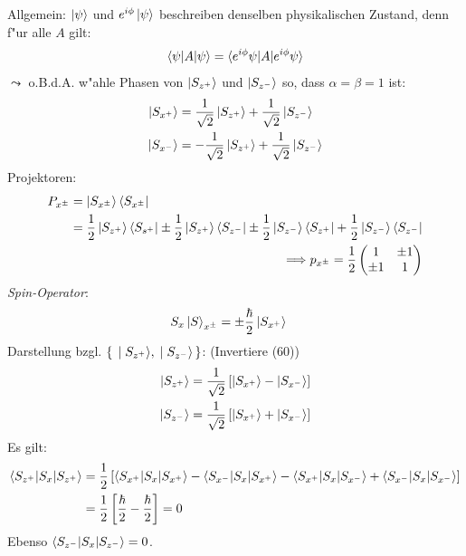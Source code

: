 \documentclass[a4paper]{scrartcl}
\begin{document}
{\begin{aaufz}
Allgemein: $\ket \psi$ und $e ^{i \phi} \ket \psi$ beschreiben denselben physikalischen Zustand, denn f"ur alle $A$ gilt:
$$\braket{ \psi | A  | \psi} = \braket{ e^{i \phi} \psi | A | e^{i \phi} \psi }$$
$\leadsto$ o.B.d.A. w"ahle Phasen von $\ket {S_{z^+}}$ und $\ket{ S_{z^-}}$ so, dass $\alpha = \beta = 1$ ist:
\begin{align}
\begin{split}
\ket{ S_{x^+}} & = \frac1{\sqrt2} \ket{S_{z^+}} + \frac1{\sqrt2} \ket{S_{z^-}} \\
\ket{ S_{x^-}} & = -\frac1{\sqrt2} \ket{ S_{z^+}} + \frac1{\sqrt2} \ket{S_{z^-}}
\end{split}
\end{align}
Projektoren:
\begin{align}
\begin{split}
P_{x^\pm} & = \ket{S_{x^\pm}} \bra{S_{x^\pm}} \\
& = \frac12  \ket{ S_{z^+} } \bra{S_{s^+}} \pm \frac 12 \ket {S_{z^+}} \bra{ S_{z^-}} \pm \frac12 \ket{S_{z^-}} \bra{S_{z^+}} + \frac12 \ket{S_{z^-}} \bra{S_{z^-}} 
\end{split} \\
\Longrightarrow p_{x^\pm} = \frac12\begin{pmatrix} 1 & \pm1 \\ \pm 1 & 1 \end{pmatrix}
\end{align}
\emph{Spin-Operator}:
\begin{align} S_x \ket S_{x^\pm} & = \pm \frac \hbar 2 \ket{S_{x^+}} \end{align}
Darstellung bzgl. $\set{ \ket{ S_{z^+}}, \ket{ S_{z^-}}}$: (Invertiere (60))
\begin{align}
\begin{split}
\ket{ S_{z^+}} & = \frac1 {\sqrt2} \left[ \ket{ S_{x^+} }- \ket{ S_{x^-}} \right] \\
\ket{ S_{z^-}} & = \frac1 {\sqrt2} \left[ \ket{ S_{x^+} }+ \ket{ S_{x^-}} \right] 
\end{split}
\end{align}
Es gilt:
\begin{align*}
\braket{ S_{z^+} | S_x | S_{z^+}} & = \frac12 \left[ \braket{S_{x^+} | S_x | S_{x^+} } - \braket{ S_{x^-} | S_x | S_{x^+}} - \braket{ S_{x^+} | S_x | S_{x^-}} + \braket{ S_{x^-} | S_x | S_{x^-}} \right]  \\ 
& = \frac12 \left[ \frac \hbar 2 - \frac \hbar 2 \right] = 0
\end{align*}
Ebenso $\braket{ S_{z^-} | S_x | S_{z^-} } = 0$.


\end{aaufz}}
\end{document}
